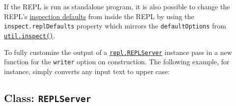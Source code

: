 If the REPL is run as standalone program, it is also possible to change
the REPL's \href{util.md\#utilinspectobject-options}{inspection
defaults} from inside the REPL by using the
\texttt{inspect.replDefaults} property which mirrors the
\texttt{defaultOptions} from
\href{util.md\#utilinspectobject-options}{\texttt{util.inspect()}}.

\begin{Shaded}
\begin{Highlighting}[]
\NormalTok{\textgreater{} [1]}
\NormalTok{[}
\NormalTok{]}
\NormalTok{\textgreater{}}
\end{Highlighting}
\end{Shaded}

To fully customize the output of a
\hyperref[class-replserver]{\texttt{repl.REPLServer}} instance pass in a
new function for the \texttt{writer} option on construction. The
following example, for instance, simply converts any input text to upper
case:

\begin{Shaded}
\begin{Highlighting}[]
\OperatorTok{=} \NormalTok{(}\NormalTok{)}\OperatorTok{;}

\OperatorTok{=}\NormalTok{(\{ }\OperatorTok{:} \StringTok{\textquotesingle{}\textgreater{} \textquotesingle{}}\OperatorTok{,} \OperatorTok{:}\OperatorTok{,} \OperatorTok{:}\OperatorTok{;}

 \OperatorTok{,}\OperatorTok{,}\OperatorTok{,}
  \NormalTok{(}\OperatorTok{,}\OperatorTok{;}
\NormalTok{\}}

 
  \NormalTok{()}\OperatorTok{;}
\NormalTok{\}}
\end{Highlighting}
\end{Shaded}

\subsection{\texorpdfstring{Class:
\texttt{REPLServer}}{Class: REPLServer}}\label{class-replserver}

